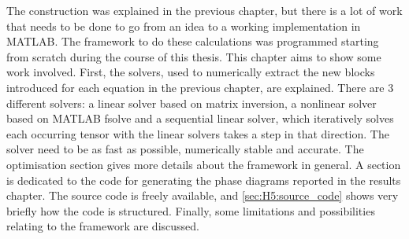 The construction was explained in the previous chapter, but there is a lot of work that needs to be done to go from an idea to a working implementation in MATLAB. The framework to do these calculations was programmed starting from scratch during the course of this thesis. This chapter aims to show some work involved. First, the solvers, used to numerically extract the new blocks introduced for each equation in the previous chapter, are explained. There are 3 different solvers: a linear solver based on matrix inversion, a nonlinear solver based on MATLAB fsolve and a sequential linear solver, which iteratively solves each occurring tensor with the linear solvers takes a step in that direction. The solver need to be as fast as possible, numerically stable and accurate. The optimisation section gives more details about the framework in general. A section is dedicated to the code for generating the phase diagrams reported in the results chapter.  The source code is freely available, and \cref{sec:H5:source_code} shows very briefly how the code is structured. Finally, some limitations and possibilities relating to the framework are discussed.